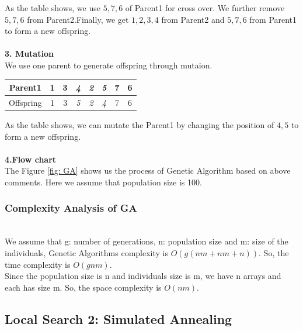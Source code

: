 As the table shows, we use $5,7,6$ of Parent1 for cross over. We further remove $5,7,6$ from Parent2.Finally, we get $1,2,3,4$ from Parent2 and $5,7,6$ from Parent1 to form a new offspring.\\
\hfill\\
\textbf{3. Mutation}\\
We use one parent to generate offspring through mutaion.\\
\begin{center}
\begin{tabular}{ |c|c|c|c|c|c|c|c| } 
 \hline
 Parent1 & 1 & 3& \emph{4}& \emph{2}& \emph{5}& 7& 6 \\
 \hline
 Offspring & 1 & 3& \emph{5}& \emph{2}& \emph{4}& 7& 6 \\ 
 \hline
\end{tabular}
\end{center}
As the table shows, we can mutate the Parent1 by changing the position of $4,5$ to form a new offspring.\\
\hfill\\
\textbf{4.Flow chart}\\
The Figure \ref{fig: GA} shows us the process of Genetic Algorithm based on above comments. Here we assume that population size is 100.

\subsubsection{Complexity Analysis of GA}
\hfill\\
We assume that g: number of generations, n: population size and m:  size of the individuals, Genetic Algorithms complexity is $O(g(nm + nm + n))$. So, the time complexity is $O(gnm)$.\\
Since the population size is n and individuals size is m, we have n arrays and each has size m. So, the space complexity is $O(nm)$.


\subsection{Local Search 2: Simulated Annealing} 
